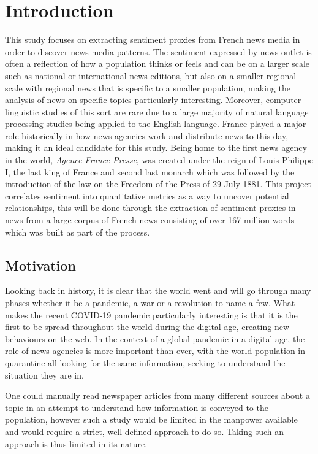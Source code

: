 \chapter{Introduction}\label{Introduction}

This study focuses on extracting sentiment proxies from French news media in order to discover news media patterns. The sentiment expressed by news outlet is often a reflection of how a population thinks or feels and can be on a larger scale such as national or international news editions, but also on a smaller regional scale with regional news that is specific to a smaller population, making the analysis of news on specific topics particularly interesting. Moreover, computer linguistic studies of this sort are rare due to a large majority of natural language processing studies being applied to the English language. France played a major role historically in how news agencies work and distribute news to this day, making it an ideal candidate for this study. Being home to the first news agency in the world, \emph{Agence France Presse}, was created under the reign of Louis Philippe I, the last king of France and second last monarch which was followed by the introduction of the law on the Freedom of the Press of 29 July 1881. This project correlates sentiment into quantitative metrics as a way to uncover potential relationships, this will be done through the extraction of sentiment proxies in news from a large corpus of French news consisting of over 167 million words which was built as part of the process. 

\section{Motivation}\label{Motivation}
Looking back in history, it is clear that the world went and will go through many phases
whether it be a pandemic, a war or a revolution to name a few. What makes the recent COVID-19 pandemic particularly interesting is that it is the first to be spread throughout the world during the digital age, creating new behaviours on the web.   
In the context of a global pandemic in a digital age, the role of news agencies is more important than ever, with the world population in quarantine all looking for the same information, seeking to understand the situation they are in.

One could manually read newspaper articles from many different sources about a topic in an attempt to understand how information is conveyed to the population, however such a study would be limited in the manpower available and would require a strict, well defined approach to do so. Taking such an approach is thus limited in its nature.

